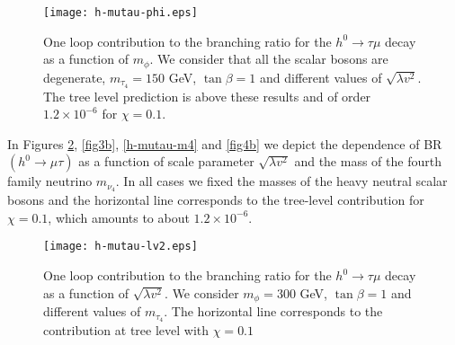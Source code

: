 \documentclass[a4paper]{jpconf}
\begin{document}
\begin{figure}[!hbt]
\centering
\texttt{[image: h-mutau-phi.eps]}
\caption{One loop contribution to the branching ratio for the $h^0\to \tau \mu$ decay as a function of $m_\phi$. We consider that all the scalar bosons are degenerate, $m_{\tau_4}=150$ GeV, $\tan\beta=1$ and different values of $\sqrt{\lambda v^2}$. The tree level prediction is above these results and of order $1.2 \times10^{-6}$ for $\chi=0.1$.}
\label{h-mutau-phi}
\end{figure}

In Figures \ref{h-mutau-lv2}, \ref{fig3b}, \ref{h-mutau-m4} and \ref{fig4b} we depict the dependence of BR$(h^0\to \mu\tau)$ as a function of scale parameter $\sqrt{\lambda v^2}$ and the mass of the fourth
family neutrino $m_{\nu_4}$. In all cases we fixed the masses of the heavy neutral scalar bosons and the horizontal line corresponds to the tree-level contribution for $\chi=0.1$, which amounts to about $1.2\times 10^{-6}  $.

\begin{figure}[!hbt]
\centering
\texttt{[image: h-mutau-lv2.eps]}
\caption{One loop contribution to the branching ratio for the $h^0\to \tau \mu$ decay as a function of $\sqrt{\lambda v^2}$. We consider $m_\phi=300$ GeV, $\tan\beta=1$ and different values of $m_{\tau_4}$. The horizontal line corresponds to the contribution at tree level with $\chi=0.1$}
\label{h-mutau-lv2}
\end{figure}
\end{document}
